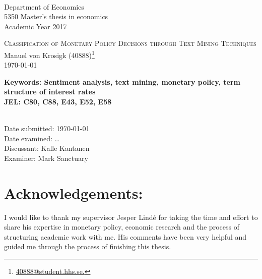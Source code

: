	\singlespacing
	\\
	Department of Economics\\
	5350 Master’s thesis in economics\\
	Academic Year 2017\\

	\vspace{1cm}	
	\begin{centering}
		\Large{\textsc{Classification of Monetary Policy Decisions through Text Mining Techniques}}\\
		\vspace{.5cm}	
		\large{Manuel von Krosigk (40888)}\footnote{\href{mailto:40888@student.hhs.se}{40888@student.hhs.se.}}\\
		\vspace{.5cm}	
		\large{\today}\\
	\end{centering}	
	\begin{abstract}
		
	\end{abstract}
	\textbf{Keywords: Sentiment analysis, text mining, monetary policy, term structure of interest rates}
	\\\textbf{JEL: C80, C88, E43, E52, E58} %
	
	\vfill
	\\Date submitted: \today
	\\Date examined: \dots
	\\Discussant: Kalle Kantanen	
	\\Examiner: Mark Sanctuary


\newpage
\section*{Acknowledgements:}
I would like to thank my supervisor Jesper Lindé for taking the time and effort to share his expertise in monetary policy, economic research and the process of structuring academic work with me. His comments have been very helpful and guided me through the process of finishing this thesis. 

